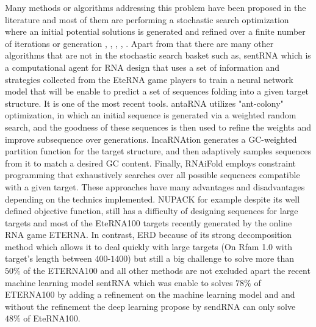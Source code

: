 \documentclass[english,12pt,a4paper]{article}
\theoremstyle{definition}
\begin{document}
Many methods  or algorithms addressing this problem have been proposed in the literature and most of them are performing a stochastic search optimization where an initial potential solutions is generated and refined over a finite number of iterations or generation \cite{esmaili2015erd}, \cite{dromi2008reconstruction}, \cite{esmaili2014evolutionary}, \cite{taneda2011modena}, \cite{churkin2017design}. Apart from that there are many other algorithms that are not in the stochastic search basket such as, sentRNA \cite{shi2018sentrna} which is a computational agent for RNA design that uses a set of information and strategies collected from the EteRNA game players to train a neural network model that will be enable to predict a set of sequences folding into a given target structure. It is one of the most recent tools.  antaRNA \cite{kleinkauf2015antarna} utilizes "ant-colony" optimization, in which an initial sequence is generated via a weighted random search, and the goodness of these sequences is then used to refine the weights and improve subsequence over generations. IncaRNAtion generates a GC-weighted partition function for the target structure, and then adaptively samples sequences from it to match a desired GC content. Finally, RNAiFold \cite{garcia2013rnaifold} employs constraint programming that exhaustively searches over all possible sequences compatible with a given target. These approaches have  many advantages and disadvantages depending on the technics implemented. NUPACK \cite{zadeh2011nucleic} for example despite its well defined objective function, still has a difficulty of designing sequences for large targets and most of the EteRNA100 targets recently generated by the online RNA game ETERNA. In contrast, ERD \cite{esmaili2015erd} because of its strong decomposition method which allows it to deal quickly with large targets (On Rfam 1.0 with target's length between $400$-$1400$) but still a big challenge to solve more than $50 \%$ of the ETERNA100 and all other methods are not excluded apart the recent machine learning model sentRNA which was enable to solves $78\%$ of ETERNA100 by adding a refinement on the machine learning model and and without the refinement the deep learning propose by sendRNA can only solve $48\%$ of EteRNA100.
\end{document}
